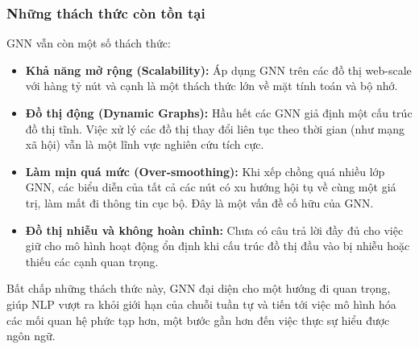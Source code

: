 \subsubsection{Những thách thức còn tồn tại}
\label{ssec:gnn_challenges}
GNN vẫn còn một số thách thức:
\begin{itemize}
    \item \textbf{Khả năng mở rộng (Scalability):} Áp dụng GNN trên các đồ thị web-scale với hàng tỷ nút và cạnh là một thách thức lớn về mặt tính toán và bộ nhớ.
    \item \textbf{Đồ thị động (Dynamic Graphs):} Hầu hết các GNN giả định một cấu trúc đồ thị tĩnh. Việc xử lý các đồ thị thay đổi liên tục theo thời gian (như mạng xã hội) vẫn là một lĩnh vực nghiên cứu tích cực.
    \item \textbf{Làm mịn quá mức (Over-smoothing):} Khi xếp chồng quá nhiều lớp GNN, các biểu diễn của tất cả các nút có xu hướng hội tụ về cùng một giá trị, làm mất đi thông tin cục bộ. Đây là một vấn đề cố hữu của GNN.
    \item \textbf{Đồ thị nhiễu và không hoàn chỉnh:} Chưa có câu trả lời đầy đủ cho việc giữ cho mô hình hoạt động ổn định khi cấu trúc đồ thị đầu vào bị nhiễu hoặc thiếu các cạnh quan trọng.
\end{itemize}

Bất chấp những thách thức này, GNN đại diện cho một hướng đi quan trọng, giúp NLP vượt ra khỏi giới hạn của chuỗi tuần tự và tiến tới việc mô hình hóa các mối quan hệ phức tạp hơn, một bước gần hơn đến việc thực sự hiểu được ngôn ngữ.